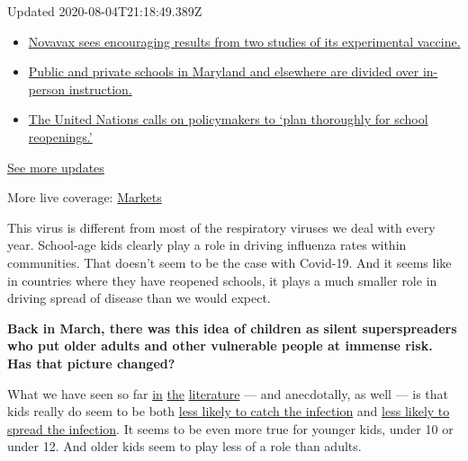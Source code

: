 Updated 2020-08-04T21:18:49.389Z

\begin{itemize}
\tightlist
\item
  \href{https://www.nytimes3xbfgragh.onion/2020/08/04/world/coronavirus-cases.html?action=click\&pgtype=Article\&state=default\&region=MAIN_CONTENT_1\&context=storylines_live_updates\#link-1228a480}{Novavax
  sees encouraging results from two studies of its experimental
  vaccine.}
\item
  \href{https://www.nytimes3xbfgragh.onion/2020/08/04/world/coronavirus-cases.html?action=click\&pgtype=Article\&state=default\&region=MAIN_CONTENT_1\&context=storylines_live_updates\#link-4825b93}{Public
  and private schools in Maryland and elsewhere are divided over
  in-person instruction.}
\item
  \href{https://www.nytimes3xbfgragh.onion/2020/08/04/world/coronavirus-cases.html?action=click\&pgtype=Article\&state=default\&region=MAIN_CONTENT_1\&context=storylines_live_updates\#link-50f7386d}{The
  United Nations calls on policymakers to `plan thoroughly for school
  reopenings.'}
\end{itemize}

\href{https://www.nytimes3xbfgragh.onion/2020/08/04/world/coronavirus-cases.html?action=click\&pgtype=Article\&state=default\&region=MAIN_CONTENT_1\&context=storylines_live_updates}{See
more updates}

More live coverage:
\href{https://www.nytimes3xbfgragh.onion/live/2020/08/04/business/stock-market-today-coronavirus?action=click\&pgtype=Article\&state=default\&region=MAIN_CONTENT_1\&context=storylines_live_updates}{Markets}

This virus is different from most of the respiratory viruses we deal
with every year. School-age kids clearly play a role in driving
influenza rates within communities. That doesn't seem to be the case
with Covid-19. And it seems like in countries where they have reopened
schools, it plays a much smaller role in driving spread of disease than
we would expect.

\textbf{Back in March, there was this idea of children as silent
superspreaders who put older adults and other vulnerable people at
immense risk. Has that picture changed?}

What we have seen so far
\href{https://academic.oup.com/cid/article/doi/10.1093/cid/ciaa794/5862649}{in}
\href{https://www.thelancet.com/journals/lanchi/article/PIIS2352-4642(20)30095-X/fulltext\#seccestitle20}{the}
\href{https://adc.bmj.com/content/105/7/618}{literature} --- and
anecdotally, as well --- is that kids really do seem to be both
\href{https://pubmed.ncbi.nlm.nih.gov/32546824/}{less likely to catch
the infection} and
\href{https://pediatrics.aappublications.org/content/early/2020/05/22/peds.2020-004879}{less
likely to spread the infection}. It seems to be even more true for
younger kids, under 10 or under 12. And older kids seem to play less of
a role than adults.

